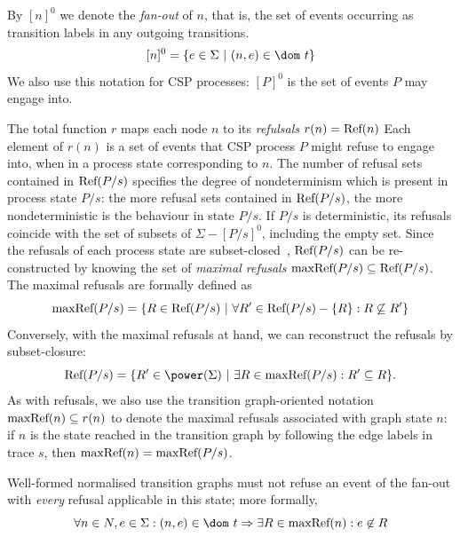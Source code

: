 By $[n]^0$ we denote the \emph{fan-out} of $n$, that is, the set of events occurring as transition labels in any outgoing transitions.
$$
[n]^0 = \{ e\in\Sigma~|~(n,e)\in\dom~t \}
$$
We also use this notation for CSP processes: $[P]^0$ is the set of events $P$ may engage into.




The total function $r$ maps each node $n$ to its \emph{refulsals} $r(n) = \text{Ref}(n)$ Each element of $r(n)$ is a set of events that
CSP process $P$ might refuse to engage into, when in a process state corresponding to $n$.
The number of refusal sets contained in $\text{Ref}(P/s)$ specifies the degree of nondeterminism
which is present in process state $P/s$: the more refusal sets contained in  $\text{Ref}(P/s)$,
the more nondeterministic is the behaviour in state $P/s$. If $P/s$ is deterministic,
its refusals coincide with the set of subsets of $\Sigma - [P/s]^0$, including the
empty set. Since the refusals of each process state are
subset-closed~\cite{Hoare:1985:CSP:3921,Roscoe2010}, $\text{Ref}(P/s)$ can be re-constructed
by knowing the set of \emph{maximal refusals} $\text{maxRef}(P/s)\subseteq\text{Ref}(P/s)$.
The maximal refusals
are formally defined as
$$
\text{maxRef}(P/s) = \{ R \in\text{Ref}(P/s)~|~\forall R'\in \text{Ref}(P/s) - \{ R\}: R \not\subseteq R'\}
$$
Conversely, with the maximal refusals at hand, we can reconstruct the refusals by subset-closure:
$$
\refs(P/s) = \{ R'\in\power(\Sigma)~|~\exists R\in \maxrefs(P/s): R'\subseteq R \}.
$$ 
As with refusals, we also use the transition graph-oriented notation 
$\text{maxRef}(n) \subseteq r(n)$ to denote the maximal refusals 
associated with graph state $n$: if $n$ is the state reached in the transition graph by following the edge labels in trace $s$, then $\text{maxRef}(n) = \text{maxRef}(P/s)$.
 
Well-formed normalised transition graphs must not refuse an event of the fan-out
with {\it every} refusal applicable in this state; more formally,
\begin{equation}
\label{eq:wellformedg}
\forall n\in N, e\in\Sigma: (n,e)\in\dom~t \Rightarrow
\exists R\in \maxrefs(n): e\not\in R
\end{equation}







